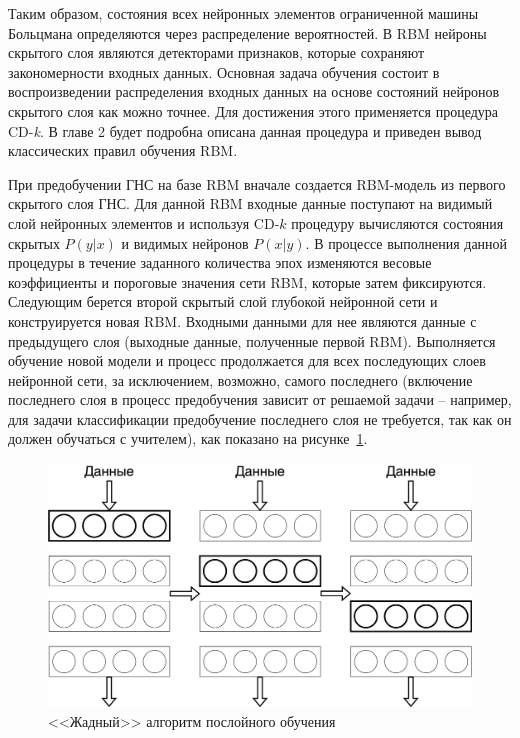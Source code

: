 Таким образом, состояния всех нейронных элементов ограниченной машины Больцмана определяются через распределение вероятностей. В RBM нейроны скрытого слоя являются детекторами признаков, которые сохраняют закономерности входных данных. Основная задача обучения состоит в воспроизведении распределения входных данных на основе состояний нейронов скрытого слоя как можно точнее. Для достижения этого применяется процедура CD-\textit{k}. В главе 2 будет подробна описана данная процедура и приведен вывод классических правил обучения RBM. %

При предобучении ГНС на базе RBM вначале создается RBM-модель из первого скрытого слоя ГНС. Для данной RBM входные данные поступают на видимый слой нейронных элементов и используя CD-$k$ процедуру вычисляются состояния скрытых $P(y \lvert x)$ и видимых нейронов $P(x \lvert y)$. В процессе выполнения данной процедуры в течение заданного количества эпох изменяются весовые коэффициенты и пороговые значения сети RBM, которые затем фиксируются. Следующим берется второй скрытый слой глубокой нейронной сети и конструируется новая RBM. Входными данными для нее являются данные с предыдущего слоя (выходные данные, полученные первой RBM). Выполняется обучение новой модели и процесс продолжается для всех последующих слоев нейронной сети, за исключением, возможно, самого последнего (включение последнего слоя в процесс предобучения зависит от решаемой задачи -- например, для задачи классификации предобучение последнего слоя не требуется, так как он должен обучаться с учителем), как показано на рисунке~\ref{fig:pic1_4}. 

\begin{figure}[H]
  \centering
  \includegraphics[width=\textwidth]{man-source/images/ch1/pic1-4.png}
  \caption{<<Жадный>> алгоритм послойного обучения}
  \label{fig:pic1_4}
\end{figure}

